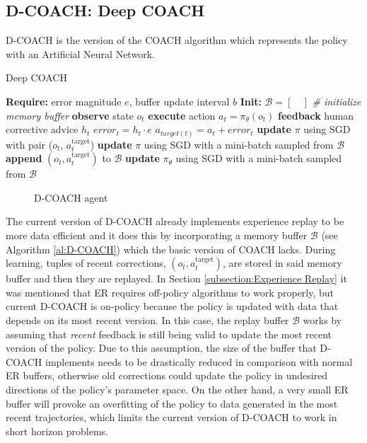 \subsection{D-COACH: Deep COACH}
\label{subsection:D-COACH}


D-COACH \cite{ResearchAssignmentpaper} is the  version of the COACH algorithm which represents the policy with an Artificial Neural Network.

\begin{algorithm}[H]
\caption{Deep COACH}\label{algorithm:DeepCOACH}
\begin{algorithmic}[1]
\State \textbf{Require:} error magnitude $e$, buffer update interval $b$
\State \textbf{Init:} $\mathcal{B} = [\quad]$  \emph{\# initialize memory buffer}
\State \textbf{observe} state $o_{t}$
\State \textbf{execute} action $a_{t}=\pi_{\theta}(o_{t})$
\State \textbf{feedback} human corrective advice $h_{t}$
\State $\mathit{error}_{t} = h_{t}\cdot e$
\State $a_{target(t)} = a_{t} + \mathit{error}_{t}$
\State \textbf{update} $\pi$ using SGD with pair ($o_{t}$, $a^{\text{target}}_{t}$)
\State \textbf{update} $\pi$ using SGD with a mini-batch sampled from $\mathcal{B}$
\State \textbf{append} $(o_{t}, a^{\text{target}}_{t})$ to $\mathcal{B}$
\EndIf
{}
\State \textbf{update} $\pi_{\theta}$ using SGD with a mini-batch sampled from $\mathcal{B}$
\EndIf
\EndFor
\end{algorithmic}
\label{al:D-COACH}
\end{algorithm}

\begin{figure}[H]
    \centering
    \caption{D-COACH agent}
    \label{fig:DCOACH_diagram}
\end{figure}

The current version of D-COACH already implements experience replay to be more data efficient and it does this by incorporating a memory buffer $\mathcal{B}$ (see Algorithm \ref{al:D-COACH}) which the basic version of COACH lacks. During learning, tuples of recent corrections, $(o_t, a^{\text{target}}_t)$, are stored in said memory buffer and then they are replayed. In Section \ref{subsection:Experience Replay} it was mentioned that ER requires off-policy algorithms to work properly, but current D-COACH is on-policy because the policy is updated with data that depends on its most recent version. In this case, the replay buffer $\mathcal{B}$ works by assuming that \textit{recent} feedback is still being valid to update the most recent version of the policy. Due to this assumption, the size of the buffer that D-COACH implements needs to be drastically reduced in comparison with normal ER buffers, otherwise old corrections could update the policy in undesired directions of the policy’s parameter space. On the other hand, a very small ER buffer will provoke an  overfitting of the policy to data generated in the most recent trajectories, which limits the current version of D-COACH to work in short horizon problems.


